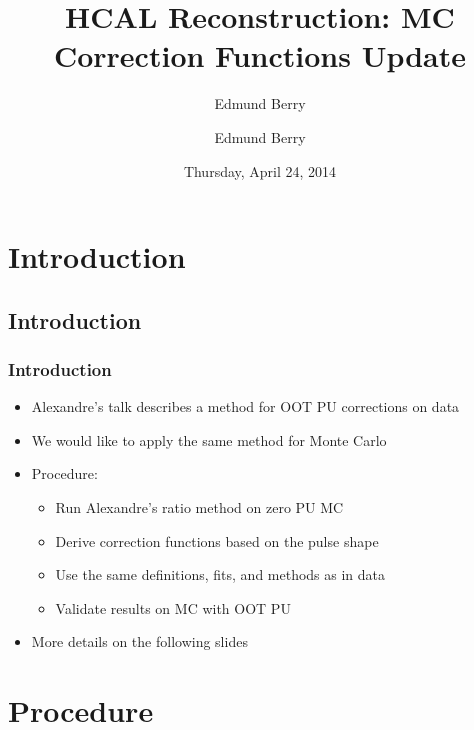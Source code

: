 \documentclass[bigger]{beamer}
\title{HCAL Reconstruction: \newline MC Correction Functions Update}
\author{Edmund Berry}
\date{Thursday, April 24, 2014}
\author[Edmund Berry]{\alert{Edmund Berry}}
\begin{document}
\maketitle


\section{Introduction}
\label{sec-1}
\subsection{Introduction}
\label{sec-1-1}
\begin{frame}
\frametitle{Introduction}
\label{sec-1-1-1}
\begin{itemize}

\item Alexandre's talk describes a method for OOT PU corrections on data
\label{sec-1-1-1-1}%

\item We would like to apply the same method for Monte Carlo
\label{sec-1-1-1-2}%

\item Procedure:
\label{sec-1-1-1-3}%
\begin{itemize}

\item Run Alexandre's ratio method on zero PU MC
\label{sec-1-1-1-3-1}%

\item Derive correction functions based on the pulse shape
\label{sec-1-1-1-3-2}%

\item Use the same definitions, fits, and methods as in data
\label{sec-1-1-1-3-3}%

\item Validate results on MC with OOT PU
\label{sec-1-1-1-3-4}%
\end{itemize} %

\item More details on the following slides
\label{sec-1-1-1-4}%
\end{itemize} %
\end{frame}
\section{Procedure}
\label{sec-2}
\end{document}
